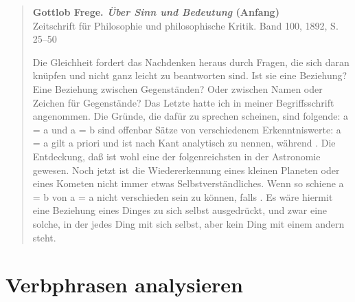 \begin{quote}
  \textbf{Gottlob Frege. \textit{Über Sinn und Bedeutung} (Anfang)}\\
  \footnotesize{Zeitschrift für Philosophie und philosophische Kritik. Band 100, 1892, S. 25–50}\\
  
  \begin{linenumbers}
  \begin{nohyphens}
  \begin{spread}
    Die Gleichheit fordert das Nachdenken heraus durch Fragen, die sich daran knüpfen und nicht ganz leicht zu beantworten sind.
    Ist sie eine Beziehung? Eine Beziehung zwischen Gegenständen? Oder zwischen Namen oder Zeichen für Gegenstände?
    Das Letzte hatte ich in meiner Begriffsschrift angenommen.
    Die Gründe, die dafür zu sprechen scheinen, sind folgende: a = a und a = b sind offenbar Sätze von verschiedenem Erkenntniswerte: a = a gilt a priori und ist nach Kant analytisch zu nennen, während .
    Die Entdeckung, daß  ist wohl eine der folgenreichsten in der Astronomie gewesen.
    Noch jetzt ist die Wiedererkennung eines kleinen Planeten oder eines Kometen nicht immer etwas Selbstverständliches.
    Wenn  so schiene a = b von a = a nicht verschieden sein zu können, falls .
    Es wäre hiermit eine Beziehung eines Dinges zu sich selbst ausgedrückt, und zwar eine solche, in der jedes Ding mit sich selbst, aber kein Ding mit einem andern steht.
  \end{spread}
  \end{nohyphens}
  \end{linenumbers}
\end{quote}

\section{Verbphrasen analysieren}\label{sec:analyse}

